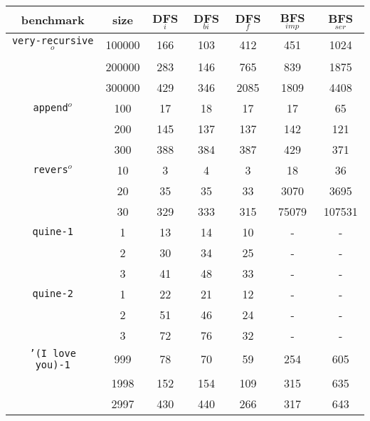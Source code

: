 \documentclass[acmlarge]{acmart}
\newcommand{\veryrecursiveo}{\texttt{very-recursive$^o$}}
\newcommand{\appendo}{\texttt{append$^o$}}
\newcommand{\reverso}{\texttt{revers$^o$}}
\newcommand{\DFSi }[0]{DFS$_{i}$}
\newcommand{\DFSf }[0]{DFS$_{f}$}
\newcommand{\DFSbi}[0]{DFS$_{bi}$}
\newcommand{\BFSser}[0]{BFS$_{ser}$}
\newcommand{\BFSimp}[0]{BFS$_{imp}$}
\begin{document}
\begin{table}
	\begin{tabular}{|c|c|c|c|c|c|c|}
		\hline 
	benchmark & size & \DFSi & \DFSbi & \DFSf & \BFSimp{} & \BFSser{} \\
		\hline
		\veryrecursiveo & 100000 & 166 & 103 & 412 &   451 &   1024 \\
	    				& 200000 & 283 & 146 & 765 &   839 &   1875 \\
						& 300000 & 429 & 346 &2085 &  1809 &   4408 \\
		\hline  
		\appendo        & 	 100 &  17 &  18 &  17 &    17 &     65 \\
		         	  	& 	 200 & 145 & 137 & 137 &   142 &    121 \\
          		      	&	 300 & 388 & 384 & 387 &   429 &    371 \\
		\hline 
		\reverso		& 	  10 &   3 &   4 &   3 &    18 &     36 \\
						& 	  20 &  35 &  35 &  33 &  3070 &   3695 \\
						& 	  30 & 329 & 333 & 315 & 75079 & 107531 \\
		\hline
	\texttt{quine-1}	& 1 & 13 & 14 & 10 & - & - \\
						& 2 & 30 & 34 & 25 & - & - \\
						& 3 & 41 & 48 & 33 & - & - \\
		\hline
	\texttt{quine-2}	& 1 & 22 & 21 & 12 & - & - \\
						& 2 & 51 & 46 & 24 & - & - \\
						& 3 & 72 & 76 & 32 & - & - \\
		\hline
\texttt{'(I love you)-1}&  999 &  78 &  70 &  59 & 254 & 605 \\
						& 1998 & 152 & 154 & 109 & 315 & 635 \\
						& 2997 & 430 & 440 & 266 & 317 & 643 \\

\end{tabular}
\end{table}
\end{document}
